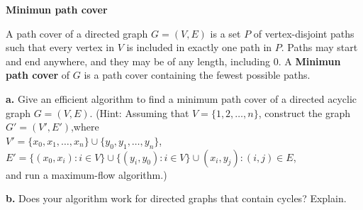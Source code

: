 \textbf{\textbf{Minimun path cover}}

A path cover of a directed graph $G=(V,E)$ is a set $P$ of vertex-disjoint 
paths such that every vertex in $V$ is included in exactly one path in $P$. 
Paths may start and end anywhere, and they may be of any length, including 0. 
A \textbf{Minimun path cover} of $G$ is a path cover containing the fewest 
possible paths.

\textbf{a.} Give an efficient algorithm to find a minimum path cover of a 
directed acyclic graph $G=(V,E)$. (Hint: Assuming that $V=\{1,2,\ldots,n\}$, 
construct the graph $G'=(V',E')$,where\\
$V' =\{x_0,x_1,\ldots,x_n\}\cup \{y_0,y_1,\ldots,y_n\}$,\\
$E' =\{(x_0,x_i):i\in V\}\cup \{(y_i,y_0):i\in V\}\cup (x_i,y_j):(i,j)\in E$,\\
and run a maximum-flow algorithm.)

\textbf{b.} Does your algorithm work for directed graphs that contain cycles? Explain.